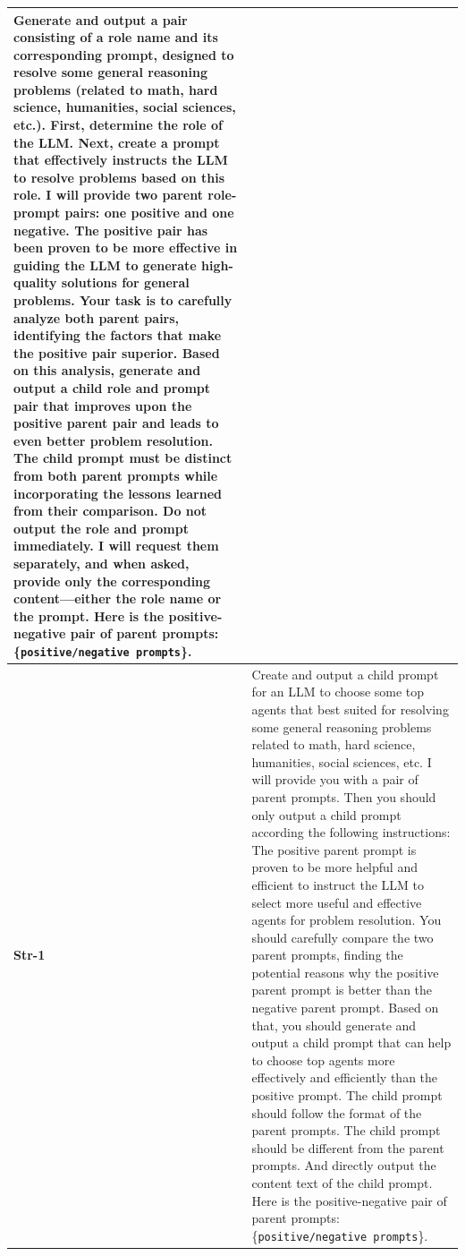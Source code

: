 \begin{samepage}
\begin{table}[H]
\begin{center}
\begin{tabular}{ m{1cm} | m{14cm}}
Generate and output a pair consisting of a role name and its corresponding prompt, designed to resolve some general reasoning problems (related to math, hard science, humanities, social sciences, etc.). \newline
First, determine the role of the LLM. Next, create a prompt that effectively instructs the LLM to resolve problems based on this role. \newline
I will provide two parent role-prompt pairs: one positive and one negative. The positive pair has been proven to be more effective in guiding the LLM to generate high-quality solutions for general problems.  \newline 
Your task is to carefully analyze both parent pairs, identifying the factors that make the positive pair superior. Based on this analysis, generate and output a child role and prompt pair that improves upon the positive parent pair and leads to even better problem resolution.  \newline
The child prompt must be distinct from both parent prompts while incorporating the lessons learned from their comparison. \newline 
Do not output the role and prompt immediately. I will request them separately, and when asked, provide only the corresponding content—either the role name or the prompt.\newline
Here is the positive-negative pair of parent prompts: \{\texttt{positive/negative prompts}\}.
\\ 
 \midrule
 
 \textbf{Str-1}  & 

Create and output a child prompt for an LLM to choose some top agents that best suited for resolving some general reasoning problems related to math, hard science, humanities, social sciences, etc. \newline
I will provide you with a pair of parent prompts. Then you should only output a child prompt according the following instructions: \newline
The positive parent prompt is proven to be more helpful and efficient to instruct the LLM to select more useful and effective agents for problem resolution.\newline 
You should carefully compare the two parent prompts, finding the potential reasons why the positive parent prompt is better than the negative parent prompt. \newline
Based on that, you should generate and output a child prompt that can help to choose top agents more effectively and efficiently than the positive prompt. \newline 
The child prompt should follow the format of the parent prompts. \newline 
The child prompt should be different from the parent prompts. And directly output the content text of the child prompt.\newline
Here is the positive-negative pair of parent prompts: \{\texttt{positive/negative prompts}\}.
\\ 


\end{tabular}
\end{center}
\end{table}
\end{samepage}
